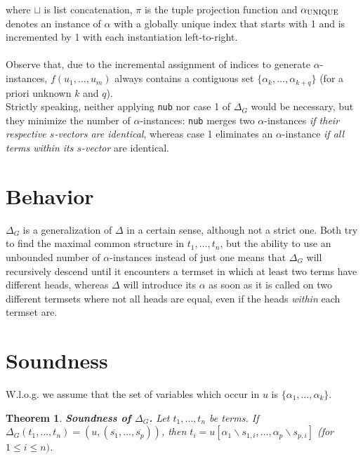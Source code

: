 \documentclass[a4paper, 11pt]{report}
\newcommand{\mt}[1]{\textnormal{#1}}
\newtheorem{theorem}{Theorem}
\begin{document}
\noindent
where $\sqcup$ is list concatenation, $\pi$ is the tuple projection function and $\alpha_{\mt{UNIQUE}}$ denotes an instance of $\alpha$ with a globally unique index that starts with 1 and is incremented by 1 with each instantiation left-to-right.\\
\\
Observe that, due to the incremental assignment of indices to generate $\alpha$-instances, $f(u_1,\dots,u_m)$ always contains a contiguous set $\{\alpha_k,\dots,\alpha_{k+q}\}$ (for a priori unknown $k$ and $q$).\\

Strictly speaking, neither applying \texttt{nub} nor case 1 of $\Delta_G$ would be necessary, but they minimize the number of $\alpha$-instances: \texttt{nub} merges two $\alpha$-instances {\em if their respective $s$-vectors are identical}, whereas case 1 eliminates an $\alpha$-instance {\em if all terms within its $s$-vector} are identical.

\section{Behavior}

$\Delta_G$ is a generalization of $\Delta$ in a certain sense, although not a strict one. Both try to find the maximal common structure in $t_1,\dots,t_n$, but the ability to use an unbounded number of $\alpha$-instances instead of just one means that $\Delta_G$ will recursively descend until it encounters a termset in which at least two terms have different heads, whereas $\Delta$ will introduce its $\alpha$ as soon as it is called on two different termsets where not all heads are equal, even if the heads {\em within} each termset are.

\section{Soundness}

W.l.o.g. we assume that the set of variables which occur in $u$ is $\{\alpha_1,\dots,\alpha_k\}$.

\begin{theorem}
\textbf{Soundness of $\Delta_G$.}
Let $t_1,\dots,t_n$ be terms. If $\Delta_G(t_1,\dots,t_n) = (u,(\overline{s_1},\dots,\overline{s_p}))$, then $t_i = u[\alpha_1\backslash s_{1,i},\dots,\alpha_p\backslash s_{p,i}]$ (for $1\leq i \leq n)$.
\label{thm:DeltaGSoundness}
\end{theorem}
\end{document}
